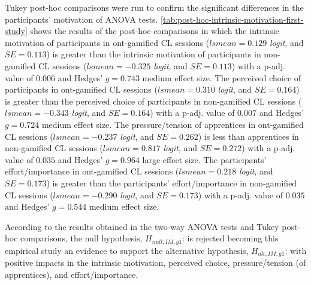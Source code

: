 Tukey post-hoc comparisons were run to confirm the significant differences in the participants' motivation of ANOVA tests.
\autoref{tab:post-hoc-intrinsic-motivation-first-study} shows the results of the post-hoc comparisons in which the intrinsic motivation of participants in ont-gamified CL sessions ($lsmean=0.129$ \emph{logit}, and $SE = 0.113$) is greater than the intrinsic motivation of participants in non-gamified CL sessions ($lsmean=-0.325$ \emph{logit}, and $SE = 0.113$) with a p-adj. value of $0.006$ and Hedges' $g=0.743$ medium effect size.
The perceived choice of participants in ont-gamified CL sessions ($lsmean=0.310$ \emph{logit}, and $SE = 0.164$) is greater than the perceived choice of participants in non-gamified CL sessions ($lsmean=-0.343$ \emph{logit}, and $SE = 0.164$) with a p-adj. value of $0.007$ and Hedges' $g=0.724$ medium effect size.
The pressure/tension of apprentices in ont-gamified CL sessions ($lsmean=-0.237$ \emph{logit}, and $SE = 0.262$) is less than apprentices in non-gamified CL sessions ($lsmean=0.817$ \emph{logit}, and $SE = 0.272$) with a p-adj. value of $0.035$ and Hedges' $g=0.964$ large effect size.
The participants' effort/importance in ont-gamified CL sessions ($lsmean=0.218$ \emph{logit}, and $SE = 0.173$) is greater than the participants' effort/importance in non-gamified CL sessions ($lsmean=-0.290$ \emph{logit}, and $SE = 0.173$) with a p-adj. value of $0.035$ and Hedges' $g=0.544$ medium effect size.

According to the results obtained in the two-way ANOVA tests and Tukey post-hoc comparisons, the null hypothesis, $H_{null,IM,g1}$:  is rejected becoming this empirical study an evidence to support the alternative hypothesis,
$H_{alt,IM,g1}$:  with positive impacts in the intrinsic motivation, perceived choice, pressure/tension (of apprentices), and effort/importance.

